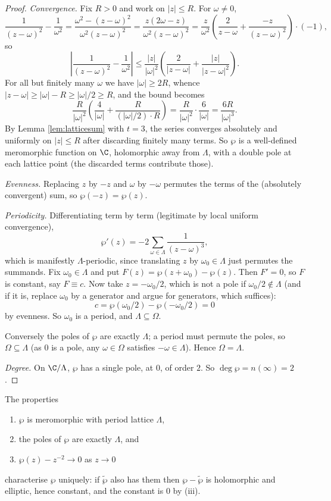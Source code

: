 \begin{proof}
	\emph{Convergence.} Fix $R > 0$ and work on $|z| \leq R$. For $\omega \neq 0$,
	$$
	\frac{1}{(z-\omega)^2}-\frac{1}{\omega^2} = \frac{\omega^2 - (z-\omega)^2}{\omega^2(z-\omega)^2}
	= \frac{z(2\omega - z)}{\omega^2(z-\omega)^2}
	= \frac{z}{\omega^2}\left(\frac{2}{z - \omega} + \frac{-z}{(z-\omega)^2}\right)\cdot(-1),
	$$
	so
	$$
	\left|\frac{1}{(z-\omega)^2}-\frac{1}{\omega^2}\right|
	\leq \frac{|z|}{|\omega|^2}\left(\frac{2}{|z-\omega|}+\frac{|z|}{|z-\omega|^2}\right).
	$$
	For all but finitely many $\omega$ we have $|\omega|\geq 2R$, whence
	$|z - \omega| \geq |\omega| - R \geq |\omega|/2 \geq R$, and the bound becomes
	$$
	\frac{R}{|\omega|^2}\left(\frac{4}{|\omega|}+\frac{R}{(|\omega|/2)\cdot R}\right)
	= \frac{R}{|\omega|^2}\cdot\frac{6}{|\omega|} = \frac{6R}{|\omega|^3}.
	$$
	By Lemma \ref{lem:latticesum} with $t = 3$, the series converges absolutely and
	uniformly on $|z|\leq R$ after discarding finitely many terms. So $\wp$ is a
	well-defined meromorphic function on $\C$, holomorphic away from $\Lambda$, with a
	double pole at each lattice point (the discarded terms contribute those).

	\emph{Evenness.} Replacing $z$ by $-z$ and $\omega$ by $-\omega$ permutes the terms of
	the (absolutely convergent) sum, so $\wp(-z)=\wp(z)$.

	\emph{Periodicity.} Differentiating term by term (legitimate by local uniform
	convergence),
	$$
	\wp'(z) = -2\sum_{\omega\in\Lambda}\frac{1}{(z-\omega)^3},
	$$
	which is manifestly $\Lambda$-periodic, since translating $z$ by $\omega_0 \in\Lambda$
	just permutes the summands. Fix $\omega_0 \in \Lambda$ and put
	$F(z) = \wp(z+\omega_0)-\wp(z)$. Then $F' = 0$, so $F$ is constant, say $F \equiv c$.
	Now take $z = -\omega_0/2$, which is not a pole if $\omega_0/2 \notin\Lambda$ (and if it
	is, replace $\omega_0$ by a generator and argue for generators, which suffices):
	$$
	c = \wp(\omega_0/2)-\wp(-\omega_0/2) = 0
	$$
	by evenness. So $\omega_0$ is a period, and $\Lambda \subseteq \Omega$.

	Conversely the poles of $\wp$ are exactly $\Lambda$; a period must permute the poles, so
	$\Omega \subseteq \Lambda$ (as $0$ is a pole, any $\omega \in \Omega$ satisfies
	$-\omega \in \Lambda$). Hence $\Omega = \Lambda$.

	\emph{Degree.} On $\C/\Lambda$, $\wp$ has a single pole, at $0$, of order $2$. So
	$\deg\wp = n(\infty) = 2$.
\end{proof}

\begin{remark}
	The properties
	\begin{enumerate}[label=(\roman*)]
		\item $\wp$ is meromorphic with period lattice $\Lambda$,
		\item the poles of $\wp$ are exactly $\Lambda$, and
		\item $\wp(z) - z^{-2}\to 0$ as $z \to 0$
	\end{enumerate}
	characterise $\wp$ uniquely: if $\tilde\wp$ also has them then $\wp - \tilde\wp$ is
	holomorphic and elliptic, hence constant, and the constant is $0$ by (iii).
\end{remark}

